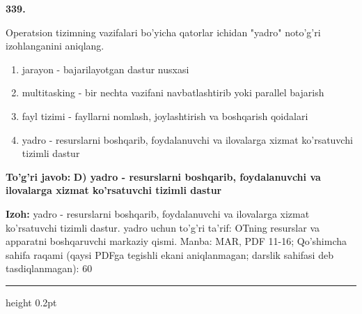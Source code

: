 \documentclass[10pt,a4paper]{article}
\begin{document}
{\bfseries\sffamily\color{ink} 339.}
\par
Operatsion tizimning vazifalari bo'yicha qatorlar ichidan "yadro" noto'g'ri izohlanganini aniqlang.
\begin{enumerate}[label=\Alph*),leftmargin=9mm]
\item jarayon - bajarilayotgan dastur nusxasi
\item multitasking - bir nechta vazifani navbatlashtirib yoki parallel bajarish
\item fayl tizimi - fayllarni nomlash, joylashtirish va boshqarish qoidalari
\item yadro - resurslarni boshqarib, foydalanuvchi va ilovalarga xizmat ko'rsatuvchi tizimli dastur
\end{enumerate}
\begin{tcolorbox}[enhanced,breakable,colback=teal!4,colframe=teal!60!black,boxrule=0.45pt,arc=1.2mm,left=2.7mm,right=2.7mm,top=1.8mm,bottom=1.8mm,before skip=2mm,after skip=2mm]
{\bfseries\sffamily\color{teal}To'g'ri javob:} \textbf{D) yadro - resurslarni boshqarib, foydalanuvchi va ilovalarga xizmat ko'rsatuvchi tizimli dastur}
\par\smallskip
{\bfseries Izoh:} yadro - resurslarni boshqarib, foydalanuvchi va ilovalarga xizmat ko'rsatuvchi tizimli dastur. yadro uchun to'g'ri ta'rif: OTning resurslar va apparatni boshqaruvchi markaziy qismi. Manba: MAR, PDF 11-16; Qo'shimcha sahifa raqami (qaysi PDFga tegishli ekani aniqlanmagan; darslik sahifasi deb tasdiqlanmagan): 60
\end{tcolorbox}
\vspace{2mm}\hrule height 0.2pt\vspace{3mm}
\end{document}
